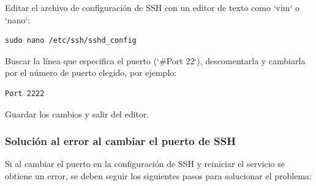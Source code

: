 Editar el archivo de configuración de SSH con un editor de texto como `vim` o `nano`:

\begin{lstlisting}[style=mystyle]
sudo nano /etc/ssh/sshd_config
\end{lstlisting}

Buscar la línea que especifica el puerto (`#Port 22`), descomentarla y cambiarla por el número de puerto elegido, por ejemplo:

\begin{lstlisting}[style=mystyle]
Port 2222
\end{lstlisting}

Guardar los cambios y salir del editor.

\subsubsection{Solución al error al cambiar el puerto de SSH}

Si al cambiar el puerto en la configuración de SSH y reiniciar el servicio se obtiene un error, se deben seguir los siguientes pasos para solucionar el problema:


